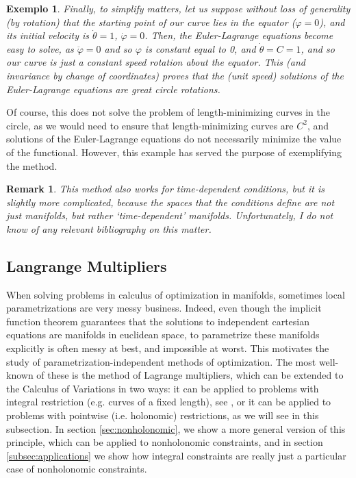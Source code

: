 \documentclass{article}
\theoremstyle{plain}
\theoremstyle{plain}
\newtheorem{remark}{Remark}
\newtheorem{example}{Exemplo}
\theoremstyle{nonumberplain}
\theoremstyle{empty}
\begin{document}
\begin{example}
Finally, to simplify matters, let us suppose without loss of generality (by rotation) that the starting point of our curve lies in the equator ($\varphi = 0$), and its initial velocity is $\dot\theta = 1$, $\dot \varphi = 0$. Then, the Euler-Lagrange equations become easy to solve, as $\ddot \varphi = 0$ and so $\varphi$ is constant equal to 0, and $\dot \theta = C = 1$, and so our curve is just a constant speed rotation about the equator. This (and invariance by change of coordinates) proves that the (unit speed) solutions of the Euler-Lagrange equations are great circle rotations.
\end{example}

Of course, this does not solve the problem of length-minimizing curves in the circle, as we would need to ensure that length-minimizing curves are $C^2$, and solutions of the Euler-Lagrange equations do not necessarily minimize the value of the functional. However, this example has served the purpose of exemplifying the method.

\begin{remark}
This method also works for time-dependent conditions, but it is slightly more complicated, because the spaces that the conditions define are not just manifolds, but rather `time-dependent' manifolds. Unfortunately, I do not know of any relevant bibliography on this matter.
\end{remark}

\subsection{Langrange Multipliers}

When solving problems in calculus of optimization in manifolds, sometimes local parametrizations are very messy business. Indeed, even though the implicit function theorem guarantees that the solutions to independent cartesian equations are manifolds in euclidean space, to parametrize these manifolds explicitly is often messy at best, and impossible at worst. This motivates the study of parametrization-independent methods of optimization. The most well-known of these is the method of Lagrange multipliers, which can be extended to the Calculus of Variations in two ways: it can be applied to problems with integral restriction (e.g. curves of a fixed length), see \cite[\S 12.1]{gelfandfomin}, or it can be applied to problems with pointwise (i.e. holonomic) restrictions, as we will see in this subsection. In section \ref{sec:nonholonomic}, we show a more general version of this principle, which can be applied to nonholonomic constraints, and in section \ref{subsec:applications} we show how integral constraints are really just a particular case of nonholonomic constraints. %
\end{document}
